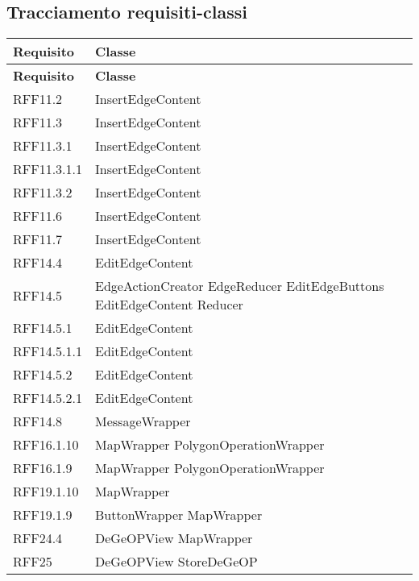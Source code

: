 	\subsection{Tracciamento requisiti-classi}
	
	\def\arraystretch{1.5}
	\begin{longtable}{p{2.5cm}!{\VRule[1pt]}p{5cm}}
		\color{white} \textbf{Requisito} & \color{white} \textbf{Classe} \\ 
		\endfirsthead
		\color{white} \textbf{Requisito} & \color{white} \textbf{Classe} \\ 
		\endhead
		RFF11.2 & InsertEdgeContent\\
		RFF11.3 & InsertEdgeContent\\
		RFF11.3.1 & InsertEdgeContent\\
		RFF11.3.1.1 & InsertEdgeContent\\
		RFF11.3.2 & InsertEdgeContent\\
		RFF11.6 & InsertEdgeContent\\
		RFF11.7 & InsertEdgeContent\\
		RFF14.4 & EditEdgeContent\\
		RFF14.5 & EdgeActionCreator \newline EdgeReducer \newline EditEdgeButtons \newline EditEdgeContent \newline Reducer\\
		RFF14.5.1 & EditEdgeContent\\
		RFF14.5.1.1 & EditEdgeContent\\
		RFF14.5.2 & EditEdgeContent\\
		RFF14.5.2.1 & EditEdgeContent\\
		RFF14.8 & MessageWrapper\\
		RFF16.1.10 & MapWrapper \newline PolygonOperationWrapper\\
		RFF16.1.9 & MapWrapper \newline PolygonOperationWrapper\\
		RFF19.1.10 & MapWrapper\\
		RFF19.1.9 & ButtonWrapper \newline MapWrapper\\
		RFF24.4 & DeGeOPView \newline MapWrapper\\
		RFF25 & DeGeOPView \newline StoreDeGeOP\\

\end{longtable}

